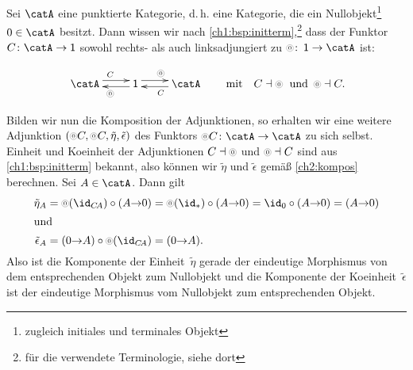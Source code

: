 \begin{thBeispiel}[Nullobjekte]
    \newcommand{\cO}{\circledchar[black!40]{$0$}}
    Sei $\catA$ eine punktierte Kategorie, d.\,h. eine Kategorie, die ein
    Nullobjekt\footnote{zugleich initiales und terminales Objekt}~$0\in\catA$ 
    besitzt. Dann wissen wir nach \cref{ch1:bsp:initterm},\footnote{für die
    verwendete Terminologie, siehe dort} dass der Funktor $C\colon\catA\to\One$ 
    sowohl rechts- als auch linksadjungiert zu $\cO\colon\One\to\catA$ ist:

    \[ 
        \xymatrix{ \catA \ar@<3.5pt>[r]^C & \ar@<2pt>[l]^{\cO} \One
        \ar@<3.5pt>[r]^{\cO} & \ar@<2pt>[l]^C \catA
        }
        \qquad\text{mit}\quad 
        C\leftadjoint\cO \text{\; und \,} \cO\leftadjoint C
    . \]

    \noindent
    Bilden wir nun die Komposition der Adjunktionen, so erhalten wir eine
    weitere Adjunktion $(\cO C, \cO C, \tilde\eta, \tilde\epsilon)$ des Funktors
    $\cO C\colon\catA\to\catA$ zu sich selbst. Einheit und Koeinheit der
    Adjunktionen $C\leftadjoint\cO$ und $\cO\leftadjoint C$ sind aus
    \cref{ch1:bsp:initterm} bekannt, also können wir $\tilde\eta$ und
    $\tilde\epsilon$ gemäß \cref{ch2:kompos} berechnen. Sei $A\in\catA$. 
    Dann gilt
    \begin{align*}
        \tilde\eta_A &= \cO(\id_{C\!A}) \after (A{\to}0)
        = \cO(\id_\ast) \after (A{\to}0) = \id_0 \after (A{\to}0) = (A{\to}0)
        \\
        \shortintertext{und}
        \tilde\epsilon_A &= (0{\to}A) \after \cO(\id_{C\!A}) = (0{\to}A)
    . \end{align*}
    Also ist die Komponente der Einheit~$\tilde\eta$ gerade der eindeutige
    Morphismus von dem entsprechenden Objekt zum Nullobjekt und die Komponente
    der Koeinheit~$\tilde\epsilon$ ist der eindeutige Morphismus vom Nullobjekt
    zum entsprechenden Objekt.
\end{thBeispiel}
